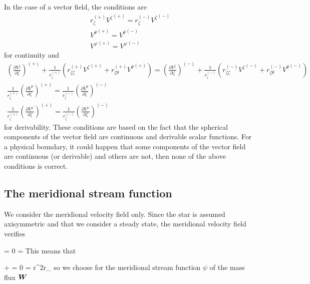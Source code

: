 In the case of a vector field, the conditions are
\begin{equation}
\begin{array}{c}
\displaystyle r_\zeta^{(+)} {V^\zeta}^{(+)}=r_\zeta^{(-)} {V^\zeta}^{(-)} \\
\displaystyle {V^\theta}^{(+)}={V^\theta}^{(-)} \\
\displaystyle {V^\varphi}^{(+)}={V^\varphi}^{(-)} 
\end{array}
\end{equation}
for continuity and
\begin{equation}
\begin{array}{c}
\displaystyle \left(\frac{\partial V^{\zeta}}{\partial\zeta}\right)^{(+)}
+\frac{1}{r_\zeta^{(+)}}\left(r_{\zeta\zeta}^{(+)}{V^\zeta}^{(+)}+r_{\zeta\theta}^{(+)}{V^\theta}^{(+)}\right)=
\left(\frac{\partial V^{\zeta}}{\partial\zeta}\right)^{(-)}
+\frac{1}{r_\zeta^{(-)}}\left(r_{\zeta\zeta}^{(-)}{V^\zeta}^{(-)}+r_{\zeta\theta}^{(-)}{V^\theta}^{(-)}\right) \\
\displaystyle \frac{1}{r_\zeta^{(+)}}\left(\frac{\partial V^{\theta}}{\partial\zeta}\right)^{(+)}= 
\frac{1}{r_\zeta^{(-)}}\left(\frac{\partial V^{\theta}}{\partial\zeta}\right)^{(-)} \\
\displaystyle \frac{1}{r_\zeta^{(+)}}\left(\frac{\partial V^{\varphi}}{\partial\zeta}\right)^{(+)}= 
\frac{1}{r_\zeta^{(-)}}\left(\frac{\partial V^{\varphi}}{\partial\zeta}\right)^{(-)}
\end{array}
\end{equation}
for derivability. These conditions are based on the fact that the spherical components of the vector field
are continuous and derivable scalar functions. For a physical boundary, it could happen that 
some components of the vector
field are continuous (or derivable) and others are not, then none of the above conditions is correct.

\subsection{The meridional stream function}

We consider the meridional velocity field only. Since the star is
assumed axisymmetric and that we consider a steady state, the meridional
velocity field verifies

\beq \Div\vW = 0 \with \vW=\rho\vv \eeq
This means that

\beq {} +  = 0 \with
{} = r^2r_\zeta\sth\eeq
so we choose for the meridional stream function $\psi$ of the mass flux $\vW$

